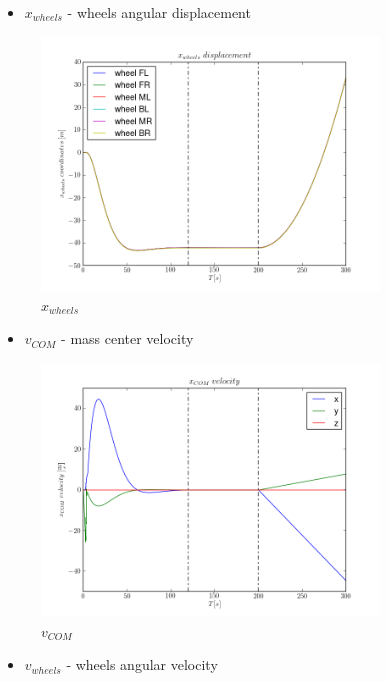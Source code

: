 \begin{itemize}
  \item $x_{wheels}$ - wheels angular displacement 
\end{itemize}

\begin{figure}[H]
  \centering
    \includegraphics[width=0.8\textwidth]{xWHEELS5}
  \caption{$x_{wheels}$}
\end{figure}

\begin{itemize}
  \item $v_{COM}$ - mass center velocity
\end{itemize}

\begin{figure}[H]
  \centering
    \includegraphics[width=0.8\textwidth]{vCOM5}
  \caption{$v_{COM}$}
\end{figure}

\begin{itemize}
  \item $v_{wheels}$ - wheels angular velocity
\end{itemize}

